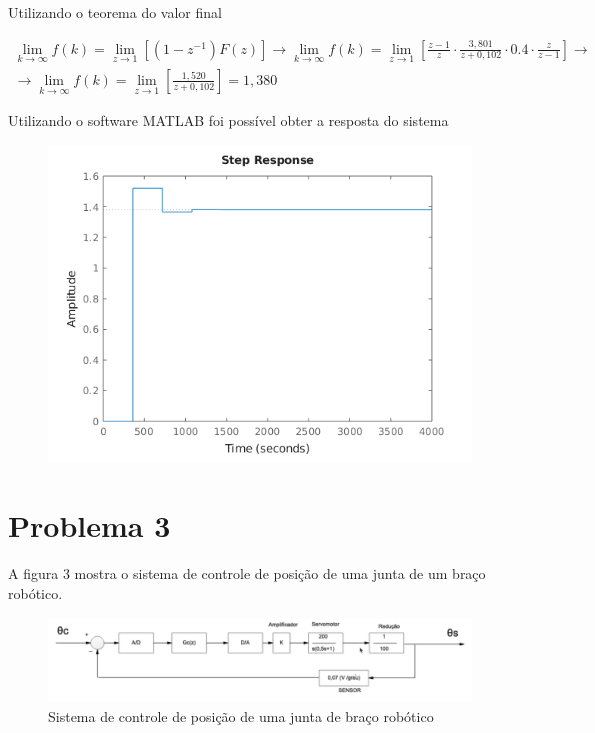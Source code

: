 \documentclass[a4paper,12pt]{article}
\begin{document}
		Utilizando o teorema do valor final
		
		\begin{equation}
			\left.
			\begin{array}{c}
				\displaystyle \lim_{k \to \infty}f(k) = \lim_{z \to 1}\left[(1-z^{-1})F(z) \right] \rightarrow \lim_{k \to \infty}f(k) = \lim_{z \to 1}\left[ \frac{z-1}{z} \cdot \frac{3,801}{z + 0,102} \cdot 0.4 \cdot \frac{z}{z-1}  \right] \rightarrow \\[20pt]
				
				\displaystyle \rightarrow \lim_{k \to \infty}f(k) =  \lim_{z \to 1}\left[  \frac{1,520}{z + 0,102}  \right] = 1,380
			\end{array}
			\right.
			\quad 
		\end{equation}	
		
		Utilizando o software MATLAB foi possível obter a resposta do sistema
		
		\begin{figure}[H]
			\centering
			\includegraphics[width=0.5\linewidth]{images/resp2g.png}
			\label{fig:resposta_g}
		\end{figure}
		
\section{Problema 3}
A figura 3 mostra o sistema de controle de posição de uma junta de um braço robótico.
\begin{figure}[H]
	\centering
	\includegraphics[width=0.9\linewidth]{images/planta_problema3}
	\caption{Sistema de controle de posição de uma junta de braço robótico}
	\label{fig:plantaproblema3}
\end{figure}
\end{document}
